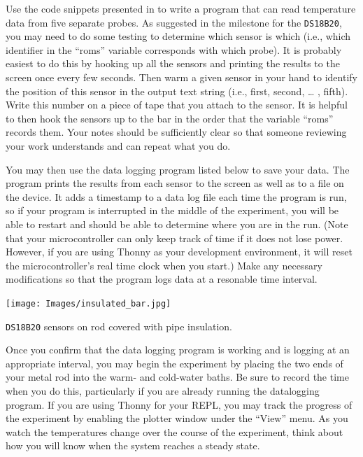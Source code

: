 Use the code snippets presented in  to write a program that can read temperature data from five separate probes.
As suggested in the milestone for the \texttt{DS18B20}, you may need to do some testing to determine which sensor is which (i.e., which identifier in the “roms” variable corresponds with which probe).
It is probably easiest to do this by hooking up all the sensors and printing the results to the screen once every few seconds.
Then warm a given sensor in your hand to identify the position of this sensor in the output text string (i.e., first, second, … , fifth).
Write this number on a piece of tape that you attach to the sensor.
It is helpful to then hook the sensors up to the bar in the order that the variable “roms” records them.
Your notes should be sufficiently clear so that someone reviewing your work understands and can repeat what you do.

You may then use the data logging program listed below to save your data.
The program prints the results from each sensor to the screen as well as to a file on the device.
It adds a timestamp to a data log file each time the program is run, so if your program is interrupted in the middle of the experiment, you will be able to restart and should be able to determine where you are in the run.
(Note that your microcontroller can only keep track of time if it does not lose power.
However, if you are using Thonny as your development environment, it will reset the microcontroller's real time clock when you start.)
Make any necessary modifications so that the program logs data at a resonable time interval.

\begin{marginfigure}[]
	\begin{center}
		\texttt{[image: Images/insulated\_bar.jpg]}
		\caption[Insulated Bar for Diffusion Experiment]{\texttt{DS18B20} sensors on rod covered with pipe insulation.}
	\end{center}
\end{marginfigure}

Once you confirm that the data logging program is working and is logging at an appropriate interval, you may begin the experiment by placing the two ends of your metal rod into the warm- and cold-water baths.
Be sure to record the time when you do this, particularly if you are already running the datalogging program.
If you are using Thonny for your REPL, you may track the progress of the experiment by enabling the plotter window under the ``View'' menu.
As you watch the temperatures change over the course of the experiment, think about how you will know when the system reaches a steady state.

